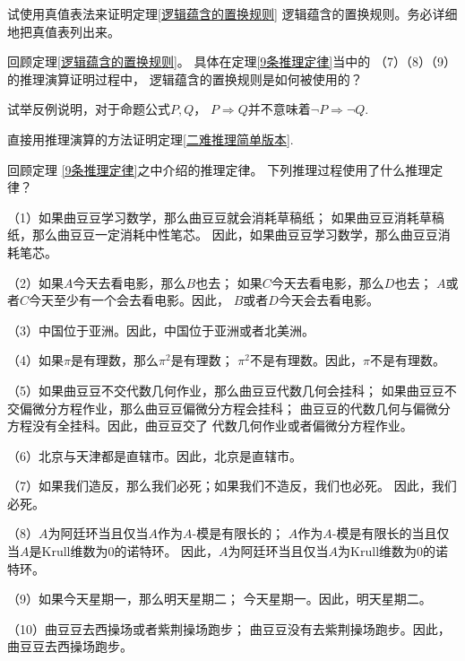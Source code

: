 \begin{prob}[真值表法的尝试]
试使用真值表法来证明定理\ref{逻辑蕴含的置换规则}
逻辑蕴含的置换规则。务必详细地把真值表列出来。
\end{prob}\vs

\begin{prob}[逻辑蕴含的置换规则的使用]
回顾定理\ref{逻辑蕴含的置换规则}。
具体在定理\ref{9条推理定律}当中的
（7）（8）（9）的推理演算证明过程中，
逻辑蕴含的置换规则是如何被使用的？
\end{prob}\vs

\begin{prob}试举反例说明，对于命题公式$P,Q$，
$P\Rightarrow Q$并不意味着$\neg P\Rightarrow \neg Q$.
\end{prob}\vs

\begin{prob}[二难推理简单版本]
直接用推理演算的方法证明定理\ref{二难推理简单版本}.
\end{prob}\vs

\begin{prob}[推理定律的日常使用]回顾定理
\ref{9条推理定律}之中介绍的推理定律。
下列推理过程使用了什么推理定律？

（1）如果曲豆豆学习数学，那么曲豆豆就会消耗草稿纸；
如果曲豆豆消耗草稿纸，那么曲豆豆一定消耗中性笔芯。
因此，如果曲豆豆学习数学，那么曲豆豆消耗笔芯。

（2）如果$A$今天去看电影，那么$B$也去；
如果$C$今天去看电影，那么$D$也去；
$A$或者$C$今天至少有一个会去看电影。因此，
$B$或者$D$今天会去看电影。

（3）中国位于亚洲。因此，中国位于亚洲或者北美洲。

（4）如果$\pi$是有理数，那么$\pi^2$是有理数；
$\pi^2$不是有理数。因此，$\pi$不是有理数。

（5）如果曲豆豆不交代数几何作业，那么曲豆豆代数几何会挂科；
如果曲豆豆不交偏微分方程作业，那么曲豆豆偏微分方程会挂科；
曲豆豆的代数几何与偏微分方程没有全挂科。因此，曲豆豆交了
代数几何作业或者偏微分方程作业。

（6）北京与天津都是直辖市。因此，北京是直辖市。

（7）如果我们造反，那么我们必死；如果我们不造反，我们也必死。
因此，我们必死。

（8）$A$为阿廷环当且仅当$A$作为$A$-模是有限长的；
$A$作为$A$-模是有限长的当且仅当$A$是Krull维数为0的诺特环。
因此，$A$为阿廷环当且仅当$A$为Krull维数为0的诺特环。

（9）如果今天星期一，那么明天星期二；
今天星期一。因此，明天星期二。

（10）曲豆豆去西操场或者紫荆操场跑步；
曲豆豆没有去紫荆操场跑步。因此，曲豆豆去西操场跑步。
\end{prob}\vs

